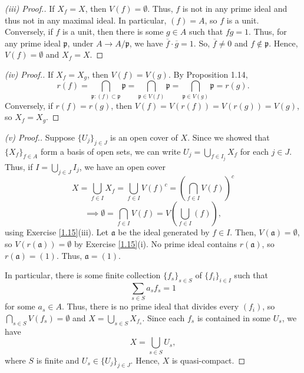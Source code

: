 \begin{proof}[(iii) Proof.]
If $X_f = X$, then $V(f) = \emptyset$. Thus, $f$ is not in any prime ideal and thus not in any maximal ideal. In particular, $(f) = A$, so $f$ is a unit.
Conversely, if $f$ is a unit, then there is some $g \in A$ such that $fg = 1$. Thus, for any prime ideal $\mathfrak{p}$, under $A \to A/\mathfrak{p}$,
we have $\overline{f}\cdot\overline{g} = 1$. So, $\overline{f} \neq 0$ and $f \not\in \mathfrak{p}$. Hence, $V(f) = \emptyset$ and $X_f = X$.
\end{proof}

\begin{proof}[(iv) Proof.]
If $X_f = X_g$, then $V(f) = V(g)$. By Proposition 1.14,
$$r(f) = \bigcap_{\mathfrak{p} : (f) \subset \mathfrak{p}}\mathfrak{p}
= \bigcap_{\mathfrak{p} \in V(f)}\mathfrak{p}
= \bigcap_{\mathfrak{p} \in V(g)}\mathfrak{p}
= r(g).$$
Conversely, if $r(f) = r(g)$, then $V(f) = V(r(f)) = V(r(g)) = V(g)$, so $X_f = X_g$.
\end{proof}

\begin{proof}[(v) Proof.]
Suppose $\{U_j\}_{j \in J}$ is an open cover of $X$. Since we showed that $\{X_f\}_{f \in A}$ form a basis of open sets, we can write 
$U_j = \bigcup_{f \in I_j}X_f$ for each $j \in J$. Thus, if $I = \bigcup_{j \in J}I_j$, we have an open cover
$$X = \bigcup_{f \in I}X_f = \bigcup_{f \in I}V(f)^c = \left(\bigcap_{f \in I}V(f)\right)^c$$
$$\implies \emptyset = \bigcap_{f \in I}V(f) = V\left(\bigcup_{f \in I}(f)\right),$$
using Exercise \ref{1.15}(iii). Let $\mathfrak{a}$ be the ideal generated by $f \in I$. Then, $V(\mathfrak{a}) = \emptyset$, so 
$V(r(\mathfrak{a})) = \emptyset$ by Exercise \ref{1.15}(i). No prime ideal contains $r(\mathfrak{a})$, so $r(\mathfrak{a}) = (1)$. Thus, $\mathfrak{a} = (1)$.

In particular, there is some finite collection $\{f_s\}_{s \in S}$ of $\{f_i\}_{i \in I}$ such that
$$\sum_{s \in S}a_s f_s = 1$$
for some $a_s \in A$. Thus, there is no prime ideal that divides every $(f_i)$, so $\bigcap_{s \in S}V(f_s) = \emptyset$ and $X = \bigcup_{s \in S}X_{f_s}$.
Since each $f_s$ is contained in some $U_s$, we have
$$X = \bigcup_{s \in S}U_s,$$
where $S$ is finite and $U_s \in \{U_j\}_{j \in J}$. Hence, $X$ is quasi-compact.
\end{proof}

